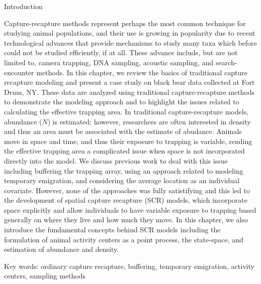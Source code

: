 
Introduction


Capture-recapture methods represent perhaps the most common technique
for studying animal populations, and their use is growing in
popularity due to recent technological advances that provide mechanisms
to study many taxa which before could not be studied efficiently, if
at all. These advance include,
but are not limited to, camera trapping, DNA sampling, acoustic sampling, and 
search-encounter methods.   In this chapter, we review the basics of traditional
capture recapture modeling and present a case study on black bear data collected at Fort Drum, NY.
These data are analyzed using traditional capture-recapture methods to demonstrate the modeling
approach and to highlight the issues related to calculating the effective trapping area.  In traditional
capture-recapture models, abundance ($N$) is estimated; however, researchers are often interested in
density and thus an area must be associated with the estimate of abudance.  Animals move in space and time, and thus their exposure to trapping is variable, rending the effective trapping area a complicated issue when space is not incorporated directly into the model.  We discuss previous work to deal with this issue including buffering the trapping array, using an approach related to modeling temporary emigration, and considering the average location as an individual covariate.  However, none of the approaches was fully satistifying and this led to the development of spatial capture recapture (SCR) models, which incorporate space explicitly and allow individuals to have variable exposure to trapping based generally on where they live and how much they move.   In this chapter, we also introduce the fundamental concepts behind SCR models including the formulation of animal activity centers as a point process, the state-space, and estimation of abundance and density.

 Key words:  ordinary capture recapture, buffering, temporary emigration, activity centers, sampling methods





